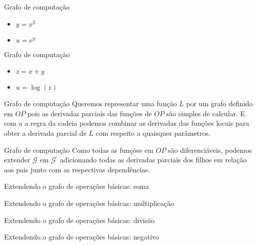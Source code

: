 \documentclass[10pt]{beamer}
\begin{document}
\begin{frame}{Grafo de computação}


\Large{
\begin{itemize}
\item $y  = x^2$
\item $u = e^{y}$
\end{itemize}
}
\end{frame}

\begin{frame}{Grafo de computação}


\Large{
\begin{itemize}
\item $z  = x + y$
\item $u = \log(z)$
\end{itemize}
}

\end{frame}

\begin{frame}{Grafo de computação}
\Large{
Queremos representar uma função $L$ por um grafo definido em $OP$ pois as derivadas parciais das funções de $OP$ são simples de calcular. E com a \alert{a regra da cadeia} podemos combinar as derivadas das funções locais para obter a derivada parcial de $L$ com respeito a quaisquer parâmetros.
}
\end{frame}

\begin{frame}{Grafo de computação}
\Large{
Como todas as funções em $OP$ são diferenciáveis, podemos extender $\mathcal{G}$ em $\mathcal{G}^{\prime}$ adicionando todas as derivadas parciais dos filhos em relação aos pais junto com as respectivas dependências. 
}
\end{frame}


\begin{frame}{Extendendo o grafo de operações básicas: soma}

\end{frame}

\begin{frame}{Extendendo o grafo de operações básicas: multiplicação}

\end{frame}

\begin{frame}{Extendendo o grafo de operações básicas: divisão}

\end{frame}

\begin{frame}{Extendendo o grafo de operações básicas: negativo}

\end{frame}
\end{document}

